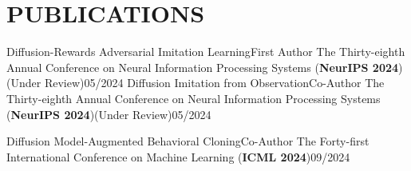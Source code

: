 \section{PUBLICATIONS}
\resumeSubHeadingListStart

    \resumeSubheading
    {Diffusion-Rewards Adversarial Imitation Learning}{First Author}
    {The Thirty-eighth Annual Conference on Neural Information Processing Systems (\textbf{NeurIPS 2024})(\textnormal{Under Review})}{05/2024}
    \vspace{-3pt}
    \resumeSubheading
      {Diffusion Imitation from Observation}{Co-Author}
      {The Thirty-eighth Annual Conference on Neural Information Processing Systems (\textbf{NeurIPS 2024})(\textnormal{Under Review})}{05/2024}
      \vspace{-3pt}

    \resumeSubheading
      {Diffusion Model-Augmented Behavioral Cloning}{Co-Author}
      {The Forty-first International Conference on Machine Learning (\textbf{ICML 2024})}{09/2024}
      \vspace{-3pt}
    
